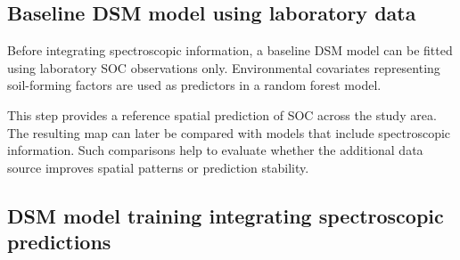 \documentclass[
  10pt,
  b5paper,
  oneside]{book}
\newenvironment{Shaded}{\begin{snugshade}}{\end{snugshade}}
\newcommand{\CommentTok}[1]{\textcolor[rgb]{0.56,0.35,0.01}{\textit{#1}}}
\newcommand{\DecValTok}[1]{\textcolor[rgb]{0.00,0.00,0.81}{#1}}
\newcommand{\FunctionTok}[1]{\textcolor[rgb]{0.13,0.29,0.53}{\textbf{#1}}}
\newcommand{\NormalTok}[1]{#1}
\newcommand{\OtherTok}[1]{\textcolor[rgb]{0.56,0.35,0.01}{#1}}
\newcommand{\SpecialCharTok}[1]{\textcolor[rgb]{0.81,0.36,0.00}{\textbf{#1}}}
\begin{document}
\begin{Shaded}
\end{Shaded}

\subsection{Baseline DSM model using laboratory data}\label{baseline-dsm-model-using-laboratory-data}

Before integrating spectroscopic information, a baseline DSM model can be fitted using laboratory SOC observations only. Environmental covariates representing soil-forming factors are used as predictors in a random forest model.

This step provides a reference spatial prediction of SOC across the study area. The resulting map can later be compared with models that include spectroscopic information. Such comparisons help to evaluate whether the additional data source improves spatial patterns or prediction stability.

\subsection{DSM model training integrating spectroscopic predictions}\label{dsm-model-training-integrating-spectroscopic-predictions}
\end{document}
